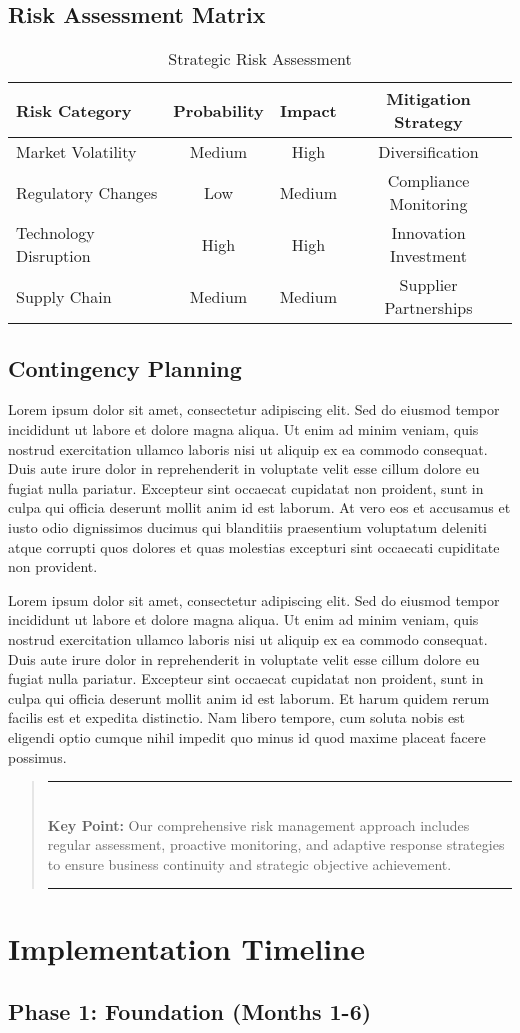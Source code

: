 \documentclass[11pt,a4paper]{article}
\newcommand{\loremtext}[1]{%
  Lorem ipsum dolor sit amet, consectetur adipiscing elit. Sed do eiusmod tempor incididunt ut labore et dolore magna aliqua. Ut enim ad minim veniam, quis nostrud exercitation ullamco laboris nisi ut aliquip ex ea commodo consequat. Duis aute irure dolor in reprehenderit in voluptate velit esse cillum dolore eu fugiat nulla pariatur. Excepteur sint occaecat cupidatat non proident, sunt in culpa qui officia deserunt mollit anim id est laborum.%
}
\newenvironment{keypoint}%
{\begin{quote}\textcolor{accent}{\rule{\textwidth}{2pt}}\vspace{0.2em}\\\textbf{Key Point:} }%
{\vspace{0.2em}\\\textcolor{accent}{\rule{\textwidth}{2pt}}\end{quote}}
\begin{document}
\subsection{Risk Assessment Matrix}

\begin{table}[h]
\centering
\begin{tabular}{|l|c|c|c|}
\hline
\textbf{Risk Category} & \textbf{Probability} & \textbf{Impact} & \textbf{Mitigation Strategy} \\
\hline
Market Volatility & Medium & High & Diversification \\
\hline
Regulatory Changes & Low & Medium & Compliance Monitoring \\
\hline
Technology Disruption & High & High & Innovation Investment \\
\hline
Supply Chain & Medium & Medium & Supplier Partnerships \\
\hline
\end{tabular}
\caption{Strategic Risk Assessment}
\end{table}

\subsection{Contingency Planning}

\loremtext{14} At vero eos et accusamus et iusto odio dignissimos ducimus qui blanditiis praesentium voluptatum deleniti atque corrupti quos dolores et quas molestias excepturi sint occaecati cupiditate non provident.

\loremtext{15} Et harum quidem rerum facilis est et expedita distinctio. Nam libero tempore, cum soluta nobis est eligendi optio cumque nihil impedit quo minus id quod maxime placeat facere possimus.

\begin{keypoint}
Our comprehensive risk management approach includes regular assessment, proactive monitoring, and adaptive response strategies to ensure business continuity and strategic objective achievement.
\end{keypoint}

\section{Implementation Timeline}

\subsection{Phase 1: Foundation (Months 1-6)}
\end{document}
